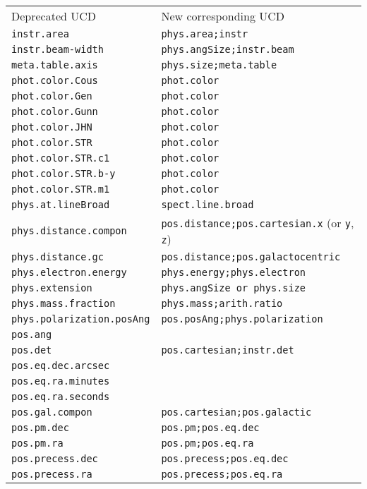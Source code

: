 \documentclass[11pt,a4paper]{ivoa}
\begin{document}
\begin{enumerate}
\begin{longtable}{|l|l|}
\sptablerule
Deprecated UCD & New corresponding UCD\\
\sptablerule
{\tt instr.area} & {\tt phys.area;instr}\\
{\tt instr.beam-width} & {\tt phys.angSize;instr.beam}\\
{\tt meta.table.axis} & {\tt phys.size;meta.table}\\
{\tt phot.color.Cous} & {\tt phot.color}\\
{\tt phot.color.Gen} & {\tt phot.color}\\
{\tt phot.color.Gunn} & {\tt phot.color}\\
{\tt phot.color.JHN} & {\tt phot.color}\\
{\tt phot.color.STR} & {\tt phot.color}\\
{\tt phot.color.STR.c1} & {\tt phot.color}\\ 
{\tt phot.color.STR.b-y} & {\tt phot.color}\\
{\tt phot.color.STR.m1} & {\tt phot.color}\\
{\tt phys.at.lineBroad} & {\tt spect.line.broad}\\ 
{\tt phys.distance.compon} & {\tt pos.distance;pos.cartesian.x} (or {\tt y}, {\tt z})\\
{\tt phys.distance.gc} & {\tt pos.distance;pos.galactocentric}\\
{\tt phys.electron.energy} & {\tt phys.energy;phys.electron}\\
{\tt phys.extension} & {\tt phys.angSize or phys.size}\\
{\tt phys.mass.fraction} & {\tt phys.mass;arith.ratio}\\
{\tt phys.polarization.posAng} & {\tt pos.posAng;phys.polarization}\\
{\tt pos.ang} & \\
{\tt pos.det} & {\tt pos.cartesian;instr.det}\\
{\tt pos.eq.dec.arcsec} & \\
{\tt pos.eq.ra.minutes} & \\
{\tt pos.eq.ra.seconds} & \\
{\tt pos.gal.compon} & {\tt pos.cartesian;pos.galactic}\\
{\tt pos.pm.dec} & {\tt pos.pm;pos.eq.dec}\\
{\tt pos.pm.ra} & {\tt pos.pm;pos.eq.ra}\\
{\tt pos.precess.dec} & {\tt pos.precess;pos.eq.dec}\\
{\tt pos.precess.ra} & {\tt pos.precess;pos.eq.ra}\\

\end{longtable}
\end{enumerate}
\end{document}
